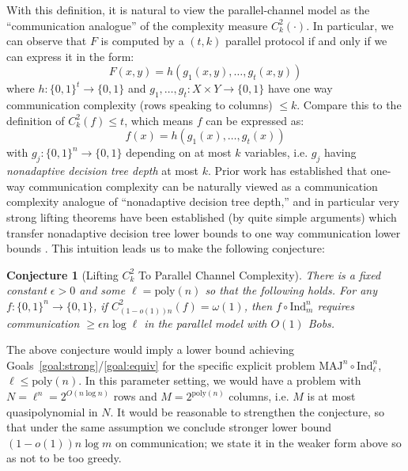 \documentclass[11pt]{article}
\newtheorem{conjecture}{Conjecture}
\newcommand{\B}{\{0,1\}}
\newcommand{\poly}{\mathrm{poly}}
\begin{document}
With this definition, it is natural to view the parallel-channel model as the ``communication analogue'' of the complexity measure $C^2_k(\cdot)$. In particular, we can observe that $F$ is computed by a $(t,k)$ parallel protocol if and only if we can express it in the form:
\[
F(x,y) = h(g_1(x,y),\ldots,g_t(x,y))
\]
where $h: \B^t \to \B$ and $g_1,\ldots,g_t: X \times Y \to \B$ have one way communication complexity (rows speaking to columns) $\leq k$. Compare this to the definition of $C^2_k(f) \leq t$, which means $f$ can be expressed as:
\[
f(x) = h(g_1(x),\ldots,g_t(x))
\]
with $g_j: \B^n \to \B$ depending on at most $k$ variables, i.e. $g_j$ having \emph{nonadaptive decision tree depth} at most $k$. Prior work has established that one-way communication complexity can be naturally viewed as a communication complexity analogue of ``nonadaptive decision tree depth,'' and in particular very strong lifting theorems have been established (by quite simple arguments) which transfer nonadaptive decision tree lower bounds to one way communication lower bounds \cite{oneway-lifting}.
This intuition leads us to make the following conjecture:
\begin{conjecture}[Lifting $C^2_k$ To Parallel Channel Complexity]\label{conj:lifting}
There is a fixed constant $\epsilon>0$ and some $\ell= \poly(n)$ so that the following holds. For any $f: \B^n \to \B$, if $C^2_{(1-o(1)) n }(f) = \omega(1)$, then $f \circ \mathrm{Ind}_m^n$ requires communication $\geq \epsilon n \log \ell$ in the parallel model with $O(1)$ Bobs.
\end{conjecture}
The above conjecture would imply a lower bound achieving Goals~\ref{goal:strong}/\ref{goal:equiv} for the specific explicit problem $\mathrm{MAJ}^n \circ \mathrm{Ind}_\ell^n$, $\ell \leq \poly(n)$. In this parameter setting, we would have a problem with $N = \ell^n = 2^{O(n\log n)}$ rows and $M = 2^{\poly(n)}$ columns, i.e. $M$ is at most quasipolynomial in $N$.
It would be reasonable to strengthen the conjecture, so that under the same assumption we conclude stronger lower bound $(1 - o(1))n\log m$ on communication; we state it in the weaker form above so as not to be too greedy.
\end{document}
